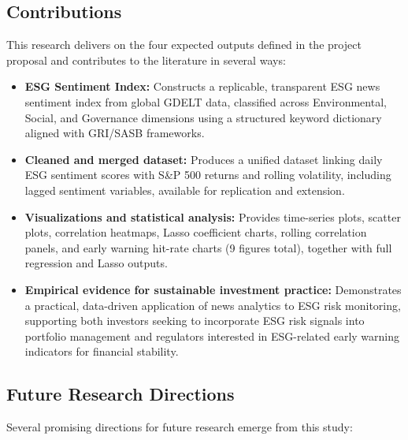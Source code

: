 \documentclass[12pt,a4paper]{article}
\begin{document}
\subsection{Contributions}
\label{subsec:contributions}

This research delivers on the four expected outputs defined in the project proposal and contributes to the literature in several ways:

\begin{itemize}[itemsep=0.5em]
    \item \textbf{ESG Sentiment Index:} Constructs a replicable, transparent ESG news sentiment index from global GDELT data, classified across Environmental, Social, and Governance dimensions using a structured keyword dictionary aligned with GRI/SASB frameworks.
    \item \textbf{Cleaned and merged dataset:} Produces a unified dataset linking daily ESG sentiment scores with S\&P 500 returns and rolling volatility, including lagged sentiment variables, available for replication and extension.
    \item \textbf{Visualizations and statistical analysis:} Provides time-series plots, scatter plots, correlation heatmaps, Lasso coefficient charts, rolling correlation panels, and early warning hit-rate charts (9 figures total), together with full regression and Lasso outputs.
    \item \textbf{Empirical evidence for sustainable investment practice:} Demonstrates a practical, data-driven application of news analytics to ESG risk monitoring, supporting both investors seeking to incorporate ESG risk signals into portfolio management and regulators interested in ESG-related early warning indicators for financial stability.
\end{itemize}

\subsection{Future Research Directions}
\label{subsec:future}

Several promising directions for future research emerge from this study:
\end{document}
